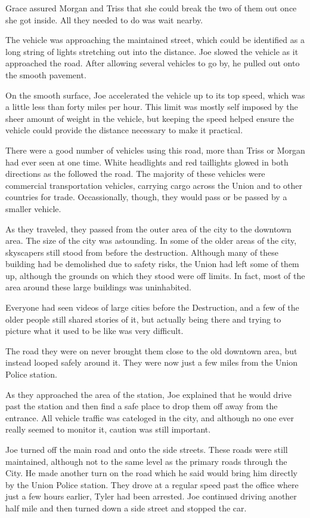 \documentclass[courier]{sffms}
\begin{document}
Grace assured Morgan and Triss that she could
break the two of them out once she got inside. All
they needed to do was wait nearby.

The vehicle was approaching the maintained street,
which could be identified as a long string of lights
stretching out into the distance. Joe slowed the 
vehicle as it approached the road. After allowing
several vehicles to go by, he pulled out onto the
smooth pavement.

On the smooth surface, Joe accelerated the vehicle
up to its top speed, which was a little less than forty
miles per hour. This limit was mostly self imposed by
the sheer amount of weight in the vehicle, but keeping
the speed helped ensure the vehicle could provide
the distance necessary to make it practical.

There were a good number of vehicles using this
road, more than Triss or Morgan had ever seen at
one time. White headlights and red taillights glowed
in both directions as the followed the road. The
majority of these vehicles were commercial transportation
vehicles, carrying cargo across the Union and to other
countries for trade. Occassionally, though, they would
pass or be passed by a smaller vehicle.

As they traveled, they passed from the outer area of
the city to the downtown area. The size of the city
was astounding. In some of the older areas of the
city, skyscapers still stood from before the destruction.
Although many of these building had be demolished
due to safety risks, the Union had left some of them
up, although the grounds on which they stood were
off limits. In fact, most of the area around these large
buildings was uninhabited.

Everyone had seen videos of large cities before the
Destruction, and a few of the older people still shared
stories of it, but actually being there and trying to
picture what it used to be like was very difficult.

The road they were on never brought them close to the
old downtown area, but instead looped safely around it.
They were now just a few miles from the Union Police
station.

As they approached the area of the station, Joe explained
that he would drive past the station and then find a safe
place to drop them off away from the entrance. All vehicle
traffic was cateloged in the city, and although no one ever
really seemed to monitor it, caution was still important.

Joe turned off the main road and onto the side streets.
These roads were still maintained, although not to the 
same level as the primary roads through the City. He
made another turn on the road which he said would 
bring him directly by the Union Police station. They drove
at a regular speed past the office where just a few
hours earlier, Tyler had been arrested. Joe
continued driving another half mile and then turned down
a side street and stopped the car.
\end{document}
